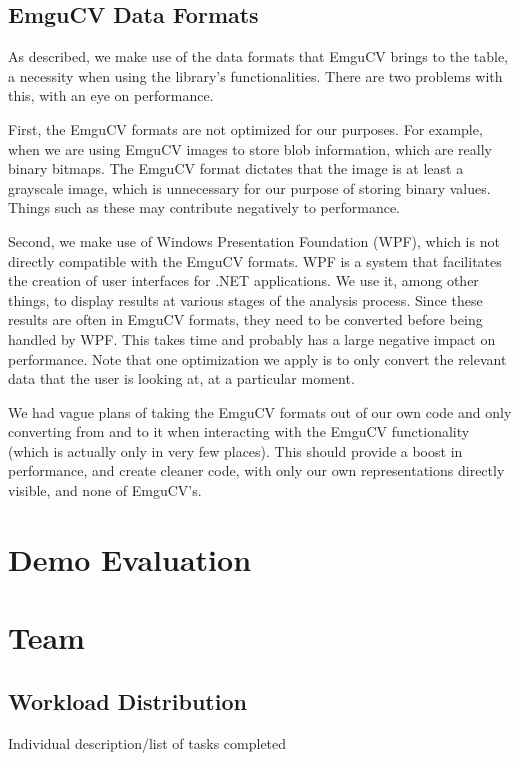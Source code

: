 \documentclass[10pt, abstracton, twocolumn]{scrartcl}
\begin{document}
\begin{appendices}
\subsection{EmguCV Data Formats}
\label{sec:emgucvFormats}
As described, we make use of the data formats that EmguCV brings to the table, a necessity when using the library's functionalities. There are two problems with this, with an eye on performance.

First, the EmguCV formats are not optimized for our purposes. For example, when we are using EmguCV images to store blob information, which are really binary bitmaps. The EmguCV format dictates that the image is at least a grayscale image, which is unnecessary for our purpose of storing binary values. Things such as these may contribute negatively to performance.

Second, we make use of Windows Presentation Foundation (WPF), which is not directly compatible with the EmguCV formats. WPF is a system that facilitates the creation of user interfaces for .NET applications. We use it, among other things, to display results at various stages of the analysis process. Since these results are often in EmguCV formats, they need to be converted before being handled by WPF. This takes time and probably has a large negative impact on performance. Note that one optimization we apply is to only convert the relevant data that the user is looking at, at a particular moment.

We had vague plans of taking the EmguCV formats out of our own code and only converting from and to it when interacting with the EmguCV functionality (which is actually only in very few places). This should provide a boost in performance, and create cleaner code, with only our own representations directly visible, and none of EmguCV's.

\section{Demo Evaluation}

\section{Team}
\label{sec:team}

\subsection{Workload Distribution}
Individual description/list of tasks completed 


\end{appendices}
\end{document}

